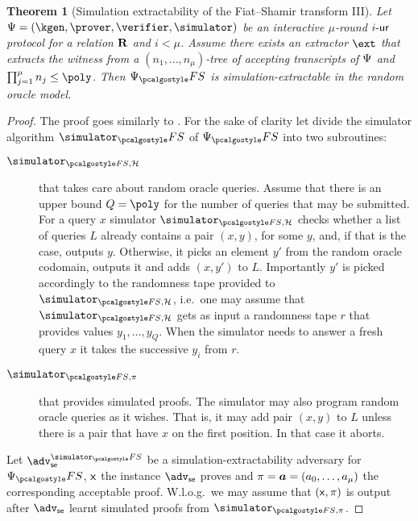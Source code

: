 \documentclass[runningheads,11pt]{llncs}
\let\spvec\vec
\let\vec\accentvec
\let\vec\spvec
\def\vec#1{\mathchoice{\mbox{\boldmath$\displaystyle#1$}}
	{\mbox{\boldmath$\textstyle#1$}}
	{\mbox{\boldmath$\scriptstyle#1$}}
	{\mbox{\boldmath$\scriptscriptstyle#1$}}}
\newtheorem{theorem}{Theorem}%
\theoremstyle{definition}
\begin{document}
\begin{theorem}[Simulation extractability of the Fiat--Shamir transform III]
	\label{thm:wit_ext_em_FS_III}
	Let $\proofsystem = (\kgen, \prover, \verifier, \simulator)$ be an interactive $\mu$-round ${i\text{-}\mathsf{ur}}$ protocol for a relation $\mathbf{R}$ and $i < \mu$.
	Assume there exists an extractor $\ext$ that extracts the witness from a $(n_1, \ldots, n_\mu)$-tree of accepting transcripts of $\mathrm{\Psi}$ and $\prod_{j = 1}^\mu n_j \leq \poly$.
	Then $\proofsystem_\fs$ is simulation-extractable in the random oracle model.
\end{theorem}
\begin{proof}
	The proof goes similarly to \cite[Theorem 3]{INDOCRYPT:FKMV12}. For the sake of clarity let divide the simulator algorithm $\simulator_\fs$ of $\proofsystem_\fs$  into two subroutines:
	\begin{description}
		\item[$\simulator_{\fs, \ro}$] that takes care about random oracle queries. Assume that there is an upper bound $Q = \poly$ for the number of queries that may be submitted.
		For a query $x$ simulator $\simulator_{\fs, \ro}$ checks whether a list of queries $L$ already contains a pair $(x, y)$, for some $y$, and, if that is the case, outputs $y$.
		Otherwise, it picks an element $y'$ from the random oracle codomain, outputs it and adds $(x, y')$ to $L$. Importantly $y'$ is picked accordingly to the randomness tape provided to $\simulator_{\fs, \ro}$, i.e.~one may assume that $\simulator_{\fs, \ro}$ gets as input a randomness tape $r$ that provides values $y_1, \ldots, y_Q$.
		When the simulator needs to answer a fresh query $x$ it takes the successive $y_i$ from $r$.
		\item[$\simulator_{\fs, \zkproof}$] that provides simulated proofs. The simulator may also program random oracle queries as it wishes. That is, it may add pair $(x, y)$ to $L$ unless there is a pair that have $x$ on the first position. In that case it aborts.
	\end{description}

	Let $\adv_\se^{\simulator_\fs}$ be a simulation-extractability adversary for $\proofsystem_\fs$, $\mathsf{x}$ the instance $\adv_\se$ proves and $\zkproof = \vec{a} = (a_0, \ldots, a_\mu)$ the corresponding acceptable proof.
	W.l.o.g.~we may assume that $(\mathsf{x}, \pi)$ is output after $\adv_\se$ learnt simulated proofs from $\simulator_{\fs, \zkproof}$.


\end{proof}
\end{document}
